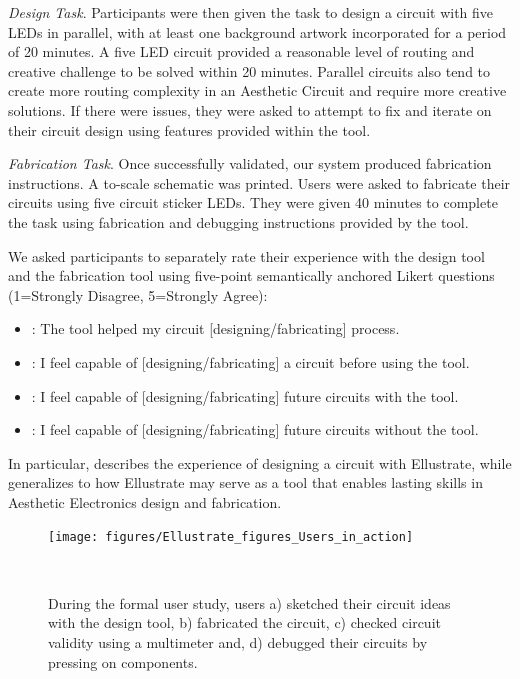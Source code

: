\documentclass{sigchi}
\begin{document}
    \textit{Design Task}. Participants were then given the task to design a circuit with five LEDs in parallel, with at least one background artwork incorporated for a period of 20 minutes. A five LED circuit provided a reasonable level of routing and creative challenge to be solved within 20 minutes. Parallel circuits also tend to create more routing complexity in an Aesthetic Circuit and require more creative solutions. If there were issues, they were asked to attempt to fix and iterate on their circuit design using features provided within the tool. 

    \textit{Fabrication Task}. Once successfully validated, our system produced fabrication instructions. A to-scale schematic was printed. Users were asked to fabricate their circuits using five circuit sticker LEDs. They were given 40 minutes to complete the task using fabrication and debugging instructions provided by the tool.  

    We asked participants to separately rate their experience with the design tool and the fabrication tool using five-point semantically anchored Likert questions (1=Strongly Disagree, 5=Strongly Agree):
    \begin{itemize}
      \item {}: The tool helped my circuit [designing/fabricating] process.
      \item {}: I feel capable of [designing/fabricating] a circuit before using the tool.
      \item {}: I feel capable of [designing/fabricating] future circuits with the tool.
      \item {}: I feel capable of [designing/fabricating] future circuits without the tool.
    \end{itemize}
    In particular,  describes the experience of designing a circuit with Ellustrate, while  generalizes to how Ellustrate may serve as a tool that enables lasting skills in Aesthetic Electronics design and fabrication.
     \begin{figure}[t]
    \centering
      \texttt{[image: figures/Ellustrate\_figures\_Users\_in\_action]}
      \caption{During the formal user study, users a) sketched their circuit ideas with the design tool, b) fabricated the circuit, c) checked circuit validity using a multimeter and, d) debugged their circuits by pressing on components.}~\label{fig:users-in-action}
      \vspace{-25pt}
    \end{figure}
\end{document}
